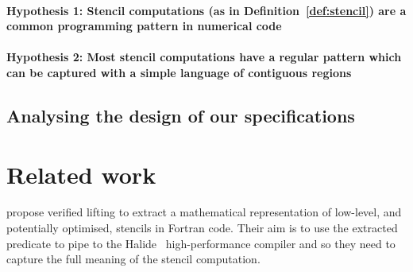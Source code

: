 \documentclass[10pt,preprint]{sigplanconf}
\theoremstyle{definition}
\begin{document}
\paragraph{Hypothesis 1: Stencil computations
(as in Definition~\ref{def:stencil}) are a common programming pattern
in numerical code}


\paragraph{Hypothesis 2: Most stencil computations
have a regular pattern which can be captured with a simple
language of contiguous regions}


%
\subsection{Analysing the design of our specifications}




\section{Related work}\label{sec:related-work}

\citet{kamil2016verified} propose verified lifting to extract a mathematical
representation of low-level, and potentially optimised, stencils in Fortran
code. Their aim is to use the extracted predicate to pipe to the \textsf{Halide}~\citep{ragan2013halide} high-performance
compiler and so they need to capture the full meaning of the stencil computation.

\end{document}
